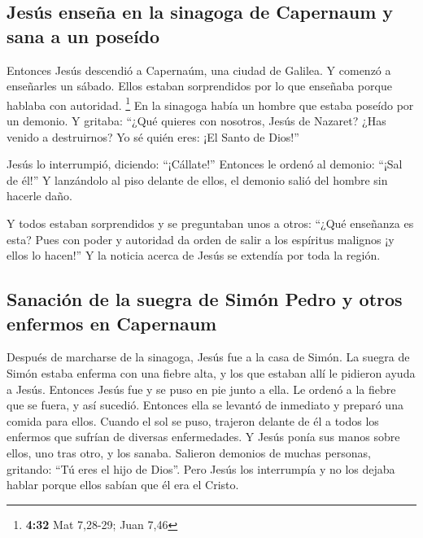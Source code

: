 \hypertarget{jesuxfas-enseuxf1a-en-la-sinagoga-de-capernaum-y-sana-a-un-poseuxeddo}{%
\subsection{Jesús enseña en la sinagoga de Capernaum y sana a un
poseído}\label{jesuxfas-enseuxf1a-en-la-sinagoga-de-capernaum-y-sana-a-un-poseuxeddo}}

 Entonces Jesús descendió a Capernaúm, una ciudad de
Galilea. Y comenzó a enseñarles un sábado.  Ellos estaban
sorprendidos por lo que enseñaba porque hablaba con autoridad.
\footnote{\textbf{4:32} Mat 7,28-29; Juan 7,46}  En la
sinagoga había un hombre que estaba poseído por un demonio. Y gritaba:
 ``¿Qué quieres con nosotros, Jesús de Nazaret? ¿Has
venido a destruirnos? Yo sé quién eres: ¡El Santo de Dios!''

 Jesús lo interrumpió, diciendo: ``¡Cállate!'' Entonces
le ordenó al demonio: ``¡Sal de él!'' Y lanzándolo al piso delante de
ellos, el demonio salió del hombre sin hacerle daño.

 Y todos estaban sorprendidos y se preguntaban unos a
otros: ``¿Qué enseñanza es esta? Pues con poder y autoridad da orden de
salir a los espíritus malignos ¡y ellos lo hacen!''  Y la
noticia acerca de Jesús se extendía por toda la región.

\hypertarget{sanaciuxf3n-de-la-suegra-de-simuxf3n-pedro-y-otros-enfermos-en-capernaum}{%
\subsection{Sanación de la suegra de Simón Pedro y otros enfermos en
Capernaum}\label{sanaciuxf3n-de-la-suegra-de-simuxf3n-pedro-y-otros-enfermos-en-capernaum}}

 Después de marcharse de la sinagoga, Jesús fue a la casa
de Simón. La suegra de Simón estaba enferma con una fiebre alta, y los
que estaban allí le pidieron ayuda a Jesús.  Entonces
Jesús fue y se puso en pie junto a ella. Le ordenó a la fiebre que se
fuera, y así sucedió. Entonces ella se levantó de inmediato y preparó
una comida para ellos.  Cuando el sol se puso, trajeron
delante de él a todos los enfermos que sufrían de diversas enfermedades.
Y Jesús ponía sus manos sobre ellos, uno tras otro, y los sanaba.
 Salieron demonios de muchas personas, gritando: ``Tú
eres el hijo de Dios''. Pero Jesús los interrumpía y no los dejaba
hablar porque ellos sabían que él era el Cristo.

